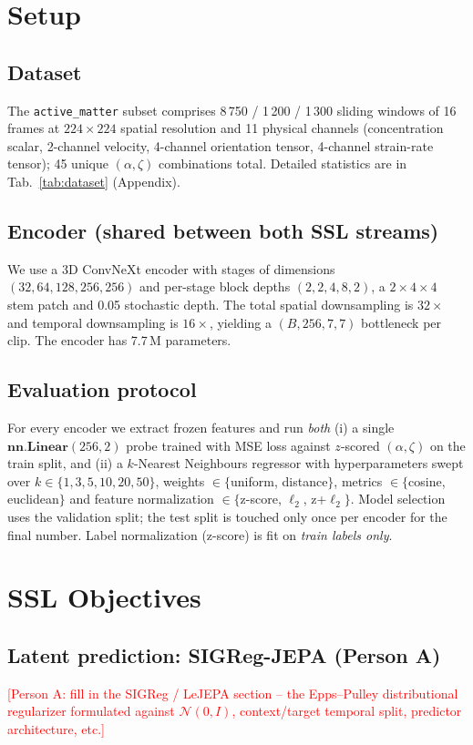\documentclass{article}
\begin{document}
\section{Setup}
\label{sec:setup}

\subsection{Dataset}
The \texttt{active\_matter} subset comprises 8\,750 / 1\,200 / 1\,300 sliding
windows of 16 frames at $224{\times}224$ spatial resolution and 11 physical
channels (concentration scalar, 2-channel velocity, 4-channel orientation
tensor, 4-channel strain-rate tensor); 45 unique $(\alpha,\zeta)$ combinations
total. Detailed statistics are in Tab.~\ref{tab:dataset} (Appendix).

\subsection{Encoder (shared between both SSL streams)}
We use a 3D ConvNeXt encoder with stages of dimensions
$(32, 64, 128, 256, 256)$ and per-stage block depths $(2, 2, 4, 8, 2)$, a
$2{\times}4{\times}4$ stem patch and 0.05 stochastic depth. The total spatial
downsampling is $32\times$ and temporal downsampling is $16\times$, yielding a
$(B, 256, 7, 7)$ bottleneck per clip. The encoder has 7.7\,M parameters.

\subsection{Evaluation protocol}
For every encoder we extract frozen features and run \emph{both}
(i) a single $\mathbf{nn.Linear}(256, 2)$ probe trained with MSE loss against
$z$-scored $(\alpha, \zeta)$ on the train split, and (ii) a $k$-Nearest
Neighbours regressor with hyperparameters swept over
$k\in\{1,3,5,10,20,50\}$, weights $\in\{$uniform, distance$\}$, metrics
$\in\{$cosine, euclidean$\}$ and feature normalization
$\in\{$z-score, $\ell_2$, z+$\ell_2\}$. Model selection uses the validation
split; the test split is touched only once per encoder for the final number.
Label normalization (z-score) is fit on \emph{train labels only}.

\section{SSL Objectives}
\label{sec:method}

\subsection{Latent prediction: SIGReg-JEPA (Person A)}
\label{sec:method-jepa}
\textcolor{red}{[Person A: fill in the SIGReg / LeJEPA section -- the
Epps--Pulley distributional regularizer formulated against $\mathcal{N}(0, I)$,
context/target temporal split, predictor architecture, etc.]}
\end{document}
